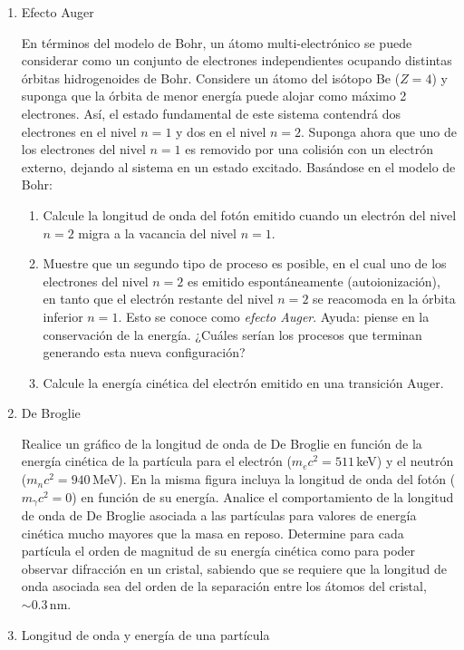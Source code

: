 \documentclass[a4paper,12pt]{article}
\begin{document}
\begin{enumerate}
\item {Efecto Auger}

En términos del modelo de Bohr, un átomo multi-electrónico se puede considerar
como un conjunto de electrones independientes ocupando distintas órbitas
hidrogenoides de Bohr. Considere un átomo del isótopo Be ($Z=4$) y suponga que
la órbita de menor energía puede alojar como máximo 2 electrones. Así, el
estado fundamental de este sistema contendrá dos electrones en el nivel $n = 1$
y dos en el nivel $n = 2$. Suponga ahora que uno de los electrones del nivel $n
= 1$ es removido por una colisión con un electrón externo, dejando al sistema
en un estado excitado. Basándose en el modelo de Bohr:

\begin{enumerate}
\item Calcule la longitud de onda del fotón emitido cuando un electrón del
nivel $n = 2$ migra a la vacancia del nivel $n = 1$.
\item Muestre que un segundo tipo de proceso es posible, en el cual uno de los
electrones del nivel $n=2$ es emitido espontáneamente (autoionización), en
tanto que el electrón restante del nivel $n=2$ se reacomoda en la órbita
inferior $n=1$. Esto se conoce como {\emph{efecto Auger}}. Ayuda: piense en la
conservación de la energía. ¿Cuáles serían los procesos que terminan generando
esta nueva configuración?
\item Calcule la energía cinética del electrón emitido en una transición Auger.
\end{enumerate}

\item {De Broglie}

Realice un gráfico de la longitud de onda de De Broglie en función de la
energía cinética de la partícula para el electrón ($m_e c^2 = 511$\,keV) y el
neutrón ($m_n c^2 = 940$\,MeV). En la misma figura incluya la longitud de onda
del fotón ($m_\gamma c^2 = 0$) en función de su energía. Analice el
comportamiento de la longitud de onda de De Broglie asociada a las partículas
para valores de energía cinética mucho mayores que la masa en reposo. Determine
para cada partícula el orden de magnitud de su energía cinética como para poder
observar difracción en un cristal, sabiendo que se requiere que la longitud de
onda asociada sea del orden de la separación entre los átomos del cristal,
$\sim 0.3$\,nm.

\item {Longitud de onda y energía de una partícula}


\end{enumerate}
\end{document}
